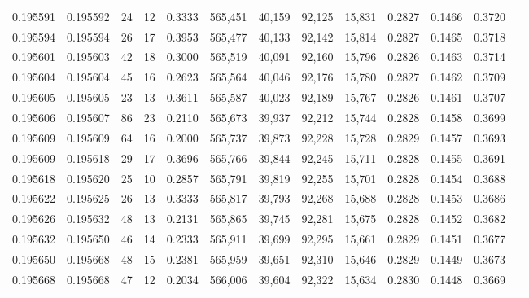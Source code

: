 \begin{tabular}{rrrrrrrrrrrrr}
0.195591 & 0.195592 &    24 &  12 &                                     0.3333 & 565,451 &  40,159 &  92,125 &  15,831 & 0.2827 & 0.1466 & 0.3720 \\
0.195594 & 0.195594 &    26 &  17 &                                     0.3953 & 565,477 &  40,133 &  92,142 &  15,814 & 0.2827 & 0.1465 & 0.3718 \\
0.195601 & 0.195603 &    42 &  18 &                                     0.3000 & 565,519 &  40,091 &  92,160 &  15,796 & 0.2826 & 0.1463 & 0.3714 \\
0.195604 & 0.195604 &    45 &  16 &                                     0.2623 & 565,564 &  40,046 &  92,176 &  15,780 & 0.2827 & 0.1462 & 0.3709 \\
0.195605 & 0.195605 &    23 &  13 &                                     0.3611 & 565,587 &  40,023 &  92,189 &  15,767 & 0.2826 & 0.1461 & 0.3707 \\
0.195606 & 0.195607 &    86 &  23 &                                     0.2110 & 565,673 &  39,937 &  92,212 &  15,744 & 0.2828 & 0.1458 & 0.3699 \\
0.195609 & 0.195609 &    64 &  16 &                                     0.2000 & 565,737 &  39,873 &  92,228 &  15,728 & 0.2829 & 0.1457 & 0.3693 \\
0.195609 & 0.195618 &    29 &  17 &                                     0.3696 & 565,766 &  39,844 &  92,245 &  15,711 & 0.2828 & 0.1455 & 0.3691 \\
0.195618 & 0.195620 &    25 &  10 &                                     0.2857 & 565,791 &  39,819 &  92,255 &  15,701 & 0.2828 & 0.1454 & 0.3688 \\
0.195622 & 0.195625 &    26 &  13 &                                     0.3333 & 565,817 &  39,793 &  92,268 &  15,688 & 0.2828 & 0.1453 & 0.3686 \\
0.195626 & 0.195632 &    48 &  13 &                                     0.2131 & 565,865 &  39,745 &  92,281 &  15,675 & 0.2828 & 0.1452 & 0.3682 \\
0.195632 & 0.195650 &    46 &  14 &                                     0.2333 & 565,911 &  39,699 &  92,295 &  15,661 & 0.2829 & 0.1451 & 0.3677 \\
0.195650 & 0.195668 &    48 &  15 &                                     0.2381 & 565,959 &  39,651 &  92,310 &  15,646 & 0.2829 & 0.1449 & 0.3673 \\
0.195668 & 0.195668 &    47 &  12 &                                     0.2034 & 566,006 &  39,604 &  92,322 &  15,634 & 0.2830 & 0.1448 & 0.3669 \\

\end{tabular}
